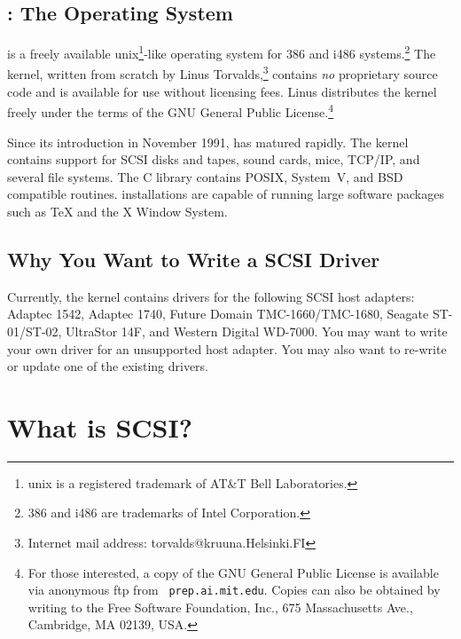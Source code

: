 \subsection{\Linux{}: The Operating System}

\Linux{} is a freely available {\sc unix}\footnote{{\sc unix} is a
  registered trademark of AT\&T Bell Laboratories.}-like operating system
for 386 and i486 systems.\footnote{386 and i486 are trademarks of Intel
  Corporation.} The kernel, written from scratch by Linus
Torvalds,\footnote{Internet mail address: torvalds@kruuna.Helsinki.FI}
contains {\em no\/} proprietary source code and is available for use
without licensing fees.  Linus distributes the kernel freely under the terms
of the GNU General Public License.\footnote{For those interested, a copy of
  the GNU General Public License is available via anonymous ftp from {\tt
    prep.ai.mit.edu}.  Copies can also be obtained by writing to the Free
  Software Foundation, Inc., 675 Massachusetts Ave., Cambridge, MA 02139,
  USA.}

Since its introduction in November 1991, \Linux{} has matured rapidly.  The
kernel contains support for SCSI disks and tapes, sound cards, mice,
TCP/IP, and several file systems.  The C library contains POSIX, System~V,
and BSD compatible routines.  \Linux{} installations are capable of running
large software packages such as \TeX{} and the X Window System.

\subsection{Why You Want to Write a SCSI Driver}

Currently, the \Linux{} kernel contains drivers for the following SCSI host
adapters: Adaptec 1542, Adaptec 1740, Future Domain TMC-1660/TMC-1680,
Seagate ST-01/ST-02, UltraStor 14F, and Western Digital WD-7000.  You may
want to write your own driver for an unsupported host adapter.  You may
also want to re-write or update one of the existing drivers.



\section{What is SCSI?}

